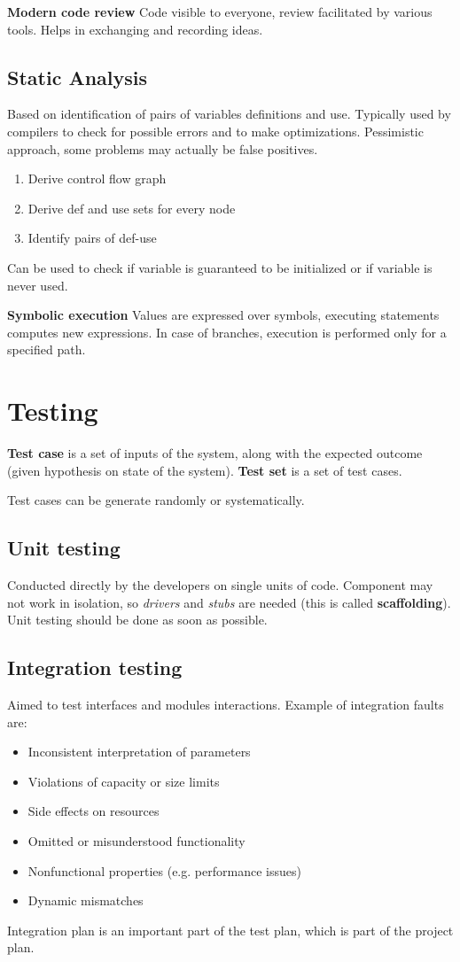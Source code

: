 \textbf{Modern code review}
Code visible to everyone, review facilitated by various tools.
Helps in exchanging and recording ideas.

\subsection{Static Analysis}
Based on identification of pairs of variables definitions and use.
Typically used by compilers to check for possible errors and to make optimizations.
Pessimistic approach, some problems may actually be false positives.
\begin{enumerate}
    \item Derive control flow graph
    \item Derive def and use sets for every node
    \item Identify pairs of def-use
\end{enumerate}

Can be used to check if variable is guaranteed to be initialized or if variable is never used.

\textbf{Symbolic execution}
Values are expressed over symbols, executing statements computes new expressions.
In case of branches, execution is performed only for a specified path.

\section{Testing}
\textbf{Test case} is a set of inputs of the system, along with the expected outcome (given hypothesis on state of the system).
\textbf{Test set} is a set of test cases.

Test cases can be generate randomly or systematically.

\subsection{Unit testing}
Conducted directly by the developers on single units of code.
Component may not work in isolation, so \emph{drivers} and \emph{stubs} are needed (this is called \textbf{scaffolding}).
Unit testing should be done as soon as possible.

\subsection{Integration testing}
Aimed to test interfaces and modules interactions.
Example of integration faults are:
\begin{itemize}
    \item Inconsistent interpretation of parameters
    \item Violations of capacity or size limits
    \item Side effects on resources
    \item Omitted or misunderstood functionality
    \item Nonfunctional properties (e.g. performance issues)
    \item Dynamic mismatches
\end{itemize}
Integration plan is an important part of the test plan, which is part of the project plan.

